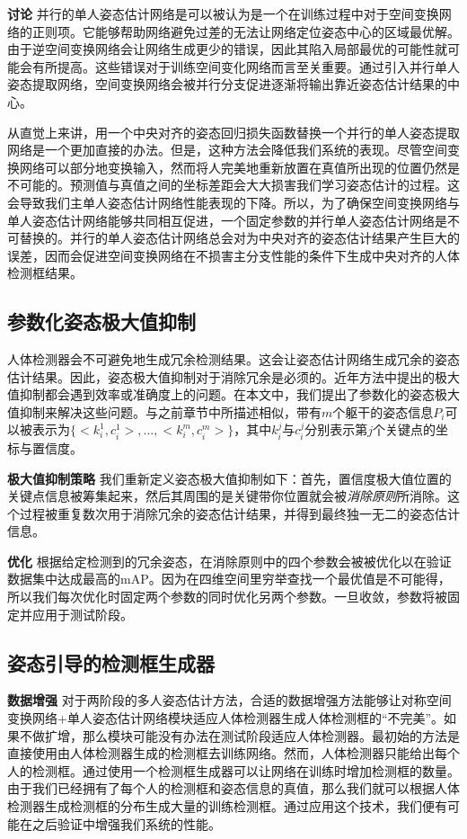 \textbf{讨论} 并行的单人姿态估计网络是可以被认为是一个在训练过程中对于空间变换网络的正则项。它能够帮助网络避免过差的无法让网络定位姿态中心的区域最优解。由于逆空间变换网络会让网络生成更少的错误，因此其陷入局部最优的可能性就可能会有所提高。这些错误对于训练空间变化网络而言至关重要。通过引入并行单人姿态提取网络，空间变换网络会被并行分支促进逐渐将输出靠近姿态估计结果的中心。

从直觉上来讲，用一个中央对齐的姿态回归损失函数替换一个并行的单人姿态提取网络是一个更加直接的办法。但是，这种方法会降低我们系统的表现。尽管空间变换网络可以部分地变换输入，然而将人完美地重新放置在真值所出现的位置仍然是不可能的。预测值与真值之间的坐标差距会大大损害我们学习姿态估计的过程。这会导致我们主单人姿态估计网络性能表现的下降。所以，为了确保空间变换网络与单人姿态估计网络能够共同相互促进，一个固定参数的并行单人姿态估计网络是不可替换的。并行的单人姿态估计网络总会对为中央对齐的姿态估计结果产生巨大的误差，因而会促进空间变换网络在不损害主分支性能的条件下生成中央对齐的人体检测框结果。

\subsection*{参数化姿态极大值抑制}
人体检测器会不可避免地生成冗余检测结果。这会让姿态估计网络生成冗余的姿态估计结果。因此，姿态极大值抑制对于消除冗余是必须的。近年方法中提出的极大值抑制都会遇到效率或准确度上的问题。在本文中，我们提出了参数化的姿态极大值抑制来解决这些问题。与之前章节中所描述相似，带有$m$个躯干的姿态信息$P_i$可以被表示为$\{<k_i^1, c_i^1>, ...,<k_i^m, c_i^m>\}$，其中$k_i^j$与$c_i^j$分别表示第$j$个关键点的坐标与置信度。

\textbf{极大值抑制策略} 我们重新定义姿态极大值抑制如下：首先，置信度极大值位置的关键点信息被筹集起来，然后其周围的是关键带你位置就会被\textit{消除原则}所消除。这个过程被重复数次用于消除冗余的姿态估计结果，并得到最终独一无二的姿态估计信息。

\textbf{优化} 根据给定检测到的冗余姿态，在消除原则中的四个参数会被被优化以在验证数据集中达成最高的mAP。因为在四维空间里穷举查找一个最优值是不可能得，所以我们每次优化时固定两个参数的同时优化另两个参数。一旦收敛，参数将被固定并应用于测试阶段。

\subsection*{姿态引导的检测框生成器}
\textbf{数据增强} 对于两阶段的多人姿态估计方法，合适的数据增强方法能够让对称空间变换网络+单人姿态估计网络模块适应人体检测器生成人体检测框的“不完美”。如果不做扩增，那么模块可能没有办法在测试阶段适应人体检测器。最初始的方法是直接使用由人体检测器生成的检测框去训练网络。然而，人体检测器只能给出每个人的检测框。通过使用一个检测框生成器可以让网络在训练时增加检测框的数量。由于我们已经拥有了每个人的检测框和姿态信息的真值，那么我们就可以根据人体检测器生成检测框的分布生成大量的训练检测框。通过应用这个技术，我们便有可能在之后验证中增强我们系统的性能。

